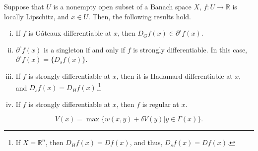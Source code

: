 \documentclass[10pt,a4paper]{amsart}
\begin{document}
\begin{prop}\label{prop5}
Suppose that $U$ is a nonempty open subset of a Banach space $X$, $f:U\to \mathbb{R}$ is locally Lipschitz, and $x\in U$. Then, the following results hold.
\begin{enumerate}[(i)]
\item If $f$ is G\^ateaux differentiable at $x$, then $D_Gf(x)\in \partial^{\circ}f(x)$.

\item $\partial^{\circ}f(x)$ is a singleton if and only if $f$ is strongly differentiable. In this case, $\partial^{\circ}f(x)=\{D_sf(x)\}$.

\item If $f$ is strongly differentiable at $x$, then it is Hadamard differentiable at $x$, and $D_sf(x)=D_Hf(x)$.\footnote{If $X=\mathbb{R}^n$, then $D_Hf(x)=Df(x)$, and thus, $D_sf(x)=Df(x)$.}

\item If $f$ is strongly differentiable at $x$, then $f$ is regular at $x$.
\end{enumerate}
\end{prop}

\begin{equation}\label{B}
V(x)=\max\{w(x,y)+\delta V(y)|y\in \Gamma(x)\}.
\end{equation}
\end{document}
